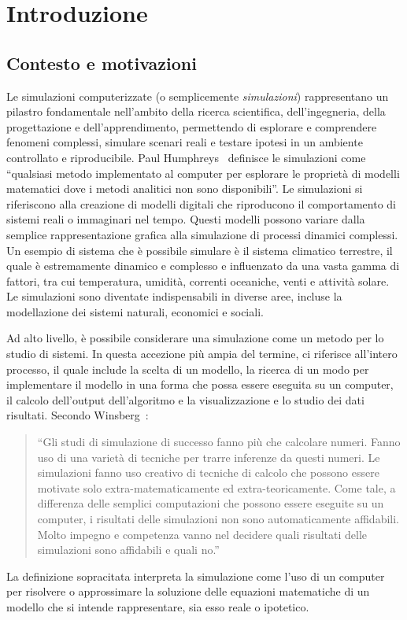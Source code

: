 \documentclass[12pt,a4paper,openright,twoside]{book}
\begin{document}
\mainmatter

\chapter{Introduzione}
\label{chap:introduzione}

\section{Contesto e motivazioni}
Le simulazioni computerizzate (o semplicemente \textit{simulazioni}) rappresentano un pilastro fondamentale nell'ambito della ricerca scientifica, dell'ingegneria, della progettazione e dell'apprendimento, permettendo di esplorare e comprendere fenomeni complessi, simulare scenari reali e testare ipotesi in un ambiente controllato e riproducibile. 
Paul Humphreys~\cite{Humphreys1990-HUMCS} definisce le simulazioni come ``qualsiasi metodo implementato al computer per esplorare le proprietà di modelli matematici dove i metodi analitici non sono disponibili''. 
Le simulazioni si riferiscono alla creazione di modelli digitali che riproducono il comportamento di sistemi reali o immaginari nel tempo. Questi modelli possono variare dalla semplice rappresentazione grafica alla simulazione di processi dinamici complessi. Un esempio di sistema che è possibile simulare è il sistema climatico terrestre, il quale è estremamente dinamico e complesso e influenzato da una vasta gamma di fattori, tra cui temperatura, umidità, correnti oceaniche, venti e attività solare.  
Le simulazioni sono diventate indispensabili in diverse aree, incluse la modellazione dei sistemi naturali, economici e sociali. 

Ad alto livello, è possibile considerare una simulazione come un metodo per lo studio di sistemi. In questa accezione più ampia del termine, ci riferisce all'intero processo, il quale include la scelta di un modello, la ricerca di un modo per implementare il modello in una forma che possa essere eseguita su un computer, il calcolo dell'output dell'algoritmo e la visualizzazione e lo studio dei dati risultati. Secondo Winsberg~\cite{Winsberg_2003}: 
\begin{quotation}
    ``Gli studi di simulazione di successo fanno più che calcolare numeri. Fanno uso di una varietà di tecniche per trarre inferenze da questi numeri. Le simulazioni fanno uso creativo di tecniche di calcolo che possono essere motivate solo extra-matematicamente ed extra-teoricamente. Come tale, a differenza delle semplici computazioni che possono essere eseguite su un computer, i risultati delle simulazioni non sono automaticamente affidabili. Molto impegno e competenza vanno nel decidere quali risultati delle simulazioni sono affidabili e quali no.''
\end{quotation}
La definizione sopracitata interpreta la simulazione come l'uso di un computer per risolvere o approssimare la soluzione delle equazioni matematiche di un modello che si intende rappresentare, sia esso reale o ipotetico. 
\end{document}
